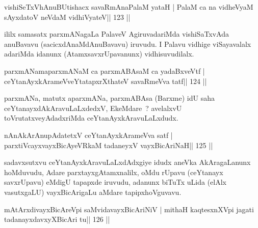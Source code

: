 \begin{shl}
vishiSeTxVhAnuBUtishacx savaRmAnaPalaM yataH |
PalaM ca na vidheVyaM sAyxdatoV neVdaM vidhiVyateV\hfill || 123 ||
\end{shl}

\begin{artha}
ililx samasatx parxmANagaLa PalaveV AgiruvadariMda vishiSaTxvAda anuBavavu (sacicxdAnaMdAnuBavavu) iruvudu. I Palavu vidhige viSayavalalx adariMda idanunx (AtamxsavxrUpavanunx) vidhisuvudilalx.
\end{artha}


\begin{shl}
parxmANamaparxmANaM ca parxmABAsaM ca yadaBxveVtf |
ceYtanAyxkArameVveYtatapxrXthateV savaRmeVva tatf\hfill || 124 ||
\end{shl}

\begin{artha}
parxmANa, matutx aparxmANa, parxmABAsa (Barxme) idU saha ceYtanayxdAkAravuLaLxdedxV, EkeMdare~? avelalxvU toVrutatxveyAdadxriMda ceYtanAyxkAravuLaLxdudx.
\end{artha}


\begin{shl}
nAnAkArAnupAdatetxV ceYtanAyxkArameVva satf |
parxtiVcayxvayxBicAyeVRkaM tadaneyxV vayxBicAriNaH\hfill || 125 ||
\end{shl}

\begin{artha}
sadavxsutxvu ceYtanAyxkAravuLaLxdAdxgiye idudx aneVka AkAragaLanunx hoMduvudu, Adare parxtayxgAtamxnalilx, oMdu rUpavu (ceYtanayx savxrUpavu) eMdigU tapapxde iruvudu, adanunx biTuTx uLida (elAlx vasutxgaLU) vayxBicArigaLu aMdare tapipxhoVguvavu.
\end{artha}

\begin{shl}
\footnotemark[1]mAtArxdivayxBicAreV\s pi saMvidavayxBicAriNiV |
\footnotemark[2]mithaH kaqtesxnXV\s pi jagati tadanayxdavxyXBicAri tu\hfill || 126 ||
\end{shl}


